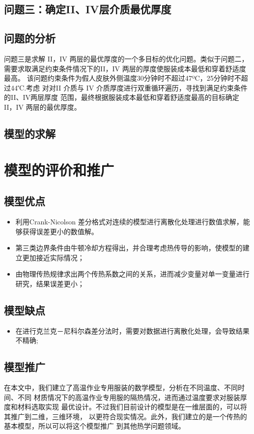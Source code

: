 \documentclass{cumcmthesis}
\begin{document}
     \subsection{问题三：确定II、IV层介质最优厚度} 
        \subsection{问题的分析} 
        问题三是求解 II，IV 两层的最优厚度的一个多目标的优化问题。类似于问题二，
    需要求取满足约束条件情况下的II，IV 两层的厚度使服装成本最低和穿着舒适度最高。
    该问题约束条件为假人皮肤外侧温度30分钟时不超过47ºC，25分钟时不超过44℃.考虑
    对对II 介质与 IV 介质厚度进行双重循环遍历，寻找到满足约束条件的II、IV两层厚度
    范围，最终根据服装成本最低和穿着舒适度最高的目标确定 II，IV 两层的最优厚度。
        \subsection{模型的求解}   

\section{模型的评价和推广}
    \subsection{模型优点} 
        \begin{itemize}
            \item 利用Crank-Nicolson 差分格式对连续的模型进行离散化处理进行数值求解，能够获得误差更小的数值解。
            \item 第三类边界条件由牛顿冷却方程得出，并合理考虑热传导的影响，使模型的建立更加接近实际情况；
            \item 由物理传热规律求出两个传热系数之间的关系，进而减少变量对单一变量进行研究，结果误差更小；
        \end{itemize}
    \subsection{模型缺点}
        \begin{itemize}
            \item 在进行克兰克－尼科尔森差分法时，需要对数据进行离散化处理，会导致结果不精确;
        \end{itemize}
    \subsection{模型推广}
    在本文中，我们建立了高温作业专用服装的数学模型，分析在不同温度、不同时间、不同
材质情况下的高温作业专用服的隔热情况，进而通过温度要求对服装厚度和材料选取实现
最优设计。不过我们目前设计的模型是在一维层面的，可以将其推广到二维，三维环境，
以更符合现实情况。此外，我们建立的是一个传热的基本模型，所以可以将这个模型推广
到其他热学问题领域。
\end{document}

